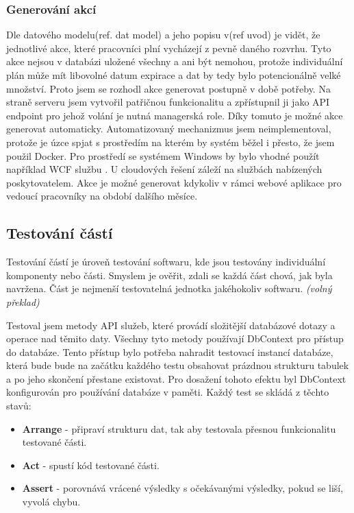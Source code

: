 \documentclass[
  biblatex,
  glossaries,
  index
]{kidiplom}
\begin{document}
\subsubsection{Generování akcí}
\label{sec:security}
Dle datového modelu(ref. dat model) a jeho popisu v(ref uvod) je vidět, že jednotlivé akce, které pracovníci plní vycházejí z pevně daného rozvrhu. Tyto akce nejsou v databázi uložené všechny a ani být nemohou, protože individuální plán může mít libovolné datum expirace a dat by tedy bylo potencionálně velké množství. Proto jsem se rozhodl akce generovat postupně v době potřeby. Na straně serveru jsem vytvořil patřičnou funkcionalitu a zpřístupnil ji jako API endpoint pro jehož volání je nutná managerská role. Díky tomuto je možné akce generovat automaticky. Automatizovaný mechanizmus jsem neimplementoval, protože je úzce spjat s prostředím na kterém by systém běžel i přesto, že jsem použil Docker. Pro prostředí se systémem Windows by bylo vhodné použít například WCF službu \cite{11}. U cloudových řešení záleží na službách nabízených poskytovatelem. Akce je možné generovat kdykoliv v rámci webové aplikace pro vedoucí pracovníky na období dalšího měsíce.

\subsection{Testování částí}
Testování částí je úroveň testování softwaru, kde jsou testovány individuální komponenty nebo části. Smyslem je ověřit, zdali se každá část chová, jak byla navržena. Část je nejmenší testovatelná jednotka jakéhokoliv softwaru.\cite{12} \textit{(volný překlad)}

Testoval jsem metody API služeb, které provádí složitější databázové dotazy a operace nad těmito daty. Všechny tyto metody používají DbContext pro přístup do databáze. Tento přístup bylo potřeba nahradit testovací instancí databáze, která bude bude na začátku každého testu obsahovat prázdnou strukturu tabulek a po jeho skončení přestane existovat. Pro dosažení tohoto efektu byl DbContext konfigurován pro používání databáze v paměti. Každý test se skládá z těchto stavů: 
\begin{itemize}
	\item \textbf{Arrange} - připraví strukturu dat, tak aby testovala přesnou funkcionalitu testované části.
	\item \textbf{Act} - spustí kód testované části.
	\item \textbf{Assert} - porovnává vrácené výsledky s očekávanými výsledky, pokud se liší, vyvolá chybu.
\end{itemize}
\end{document}
